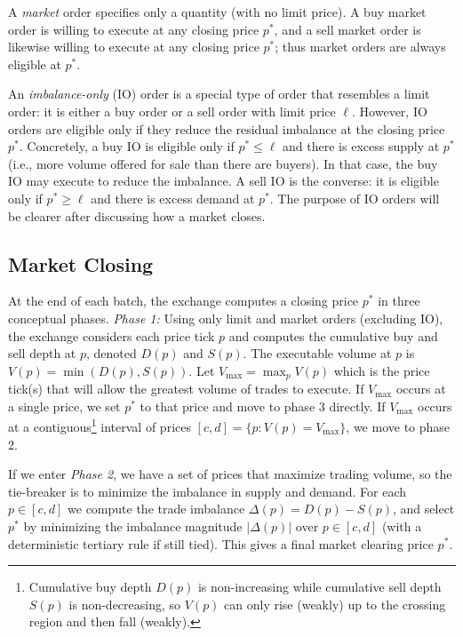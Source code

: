 \documentclass[runningheads]{llncs}
\begin{document}
A \textit{market} order specifies only a quantity (with no limit price). A buy market order is willing to execute at any closing price $p^*$, and a sell market order is likewise willing to execute at any closing price $p^*$; thus market orders are always eligible at $p^*$.

An \textit{imbalance-only} (IO) order is a special type of order that resembles a limit order: it is either a buy order or a sell order with limit price $\ell$. However, IO orders are eligible only if they reduce the residual imbalance at the closing price $p^*$. Concretely, a buy IO is eligible only if $p^* \le \ell$ and there is excess supply at $p^*$ (i.e., more volume offered for sale than there are buyers). In that case, the buy IO may execute to reduce the imbalance. A sell IO is the converse: it is eligible only if $p^* \ge \ell$ and there is excess demand at $p^*$. The purpose of IO orders will be clearer after discussing how a market closes.

\subsection{Market Closing} 

At the end of each batch, the exchange computes a closing price $p^*$ in three conceptual phases. \emph{Phase 1:} Using only limit and market orders (\ie excluding IO), the exchange considers each price tick $p$ and computes the cumulative buy and sell depth at $p$, denoted $D(p)$ and $S(p)$. The executable volume at $p$ is $V(p) = \min(D(p), S(p))$. Let $V_{\max} = \max_p V(p)$ which is the price tick(s) that will allow the greatest volume of trades to execute. If $V_{\max}$ occurs at a single price, we set $p^*$ to that price and move to phase 3 directly. If $V_{\max}$ occurs at a contiguous\footnote{Cumulative buy depth $D(p)$ is non-increasing while cumulative sell depth $S(p)$ is non-decreasing, so $V(p)$ can only rise (weakly) up to the crossing region and then fall (weakly).} interval of prices $[c,d] = \{p : V(p)=V_{\max}\}$, we move to phase 2.

If we enter \emph{Phase 2}, we have a set of prices that maximize trading volume, so the tie-breaker is to minimize the imbalance in supply and demand. For each $p \in [c,d]$ we compute the trade imbalance $\Delta(p) = D(p) - S(p)$, and select $p^*$ by minimizing the imbalance magnitude $|\Delta(p)|$ over $p \in [c,d]$ (with a deterministic tertiary rule if still tied). This gives a final market clearing price $p^*$.
\end{document}
